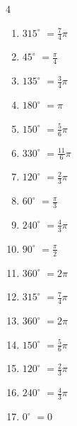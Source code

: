 \begin{multicols}{4}
\begin{enumerate}
  \item $\displaystyle 315^{\circ}$
        $\displaystyle =\frac{7}{4}\pi$

  \item $\displaystyle 45^{\circ}$
        $\displaystyle =\frac{\pi}{4}$

  \item $\displaystyle 135^{\circ}$
        $\displaystyle =\frac{3}{4}\pi$

  \item $\displaystyle 180^{\circ}$
        $\displaystyle =\pi$

  \item $\displaystyle 150^{\circ}$
        $\displaystyle =\frac{5}{6}\pi$

  \item $\displaystyle 330^{\circ}$
        $\displaystyle =\frac{11}{6}\pi$

  \item $\displaystyle 120^{\circ}$
        $\displaystyle =\frac{2}{3}\pi$

  \item $\displaystyle 60^{\circ}$
        $\displaystyle =\frac{\pi}{3}$

  \item $\displaystyle 240^{\circ}$
        $\displaystyle =\frac{4}{3}\pi$

  \item $\displaystyle 90^{\circ}$
        $\displaystyle =\frac{\pi}{2}$

\columnbreak %

  \item $\displaystyle 360^{\circ}$
        $\displaystyle =2\pi$

  \item $\displaystyle 315^{\circ}$
        $\displaystyle =\frac{7}{4}\pi$

  \item $\displaystyle 360^{\circ}$
        $\displaystyle =2\pi$

  \item $\displaystyle 150^{\circ}$
        $\displaystyle =\frac{5}{6}\pi$

  \item $\displaystyle 120^{\circ}$
        $\displaystyle =\frac{2}{3}\pi$

  \item $\displaystyle 240^{\circ}$
        $\displaystyle =\frac{4}{3}\pi$

  \item $\displaystyle 0^{\circ}$
        $\displaystyle =0$


\end{enumerate}
\end{multicols}
